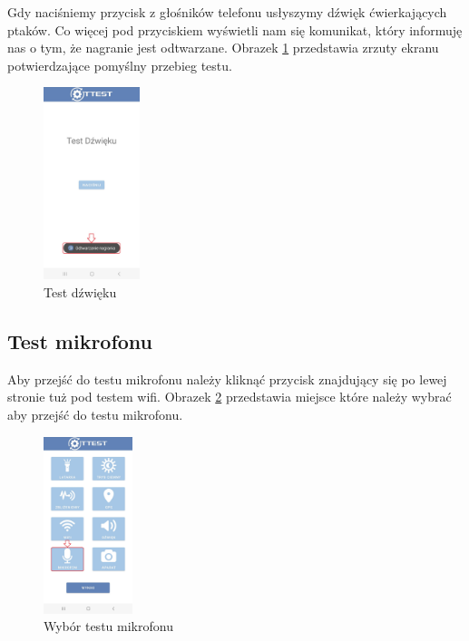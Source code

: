 \newpage


Gdy naciśniemy przycisk z głośników telefonu usłyszymy dźwięk ćwierkających ptaków. Co więcej pod przyciskiem wyświetli nam się komunikat, który informuję nas o tym, że nagranie jest odtwarzane.  
\newline
Obrazek \ref{rys:dźwięk2} przedstawia zrzuty ekranu potwierdzające pomyślny przebieg testu.

\begin{figure}[!hbt]
	\begin{center}
		\includegraphics[angle=360, width=0.25\textwidth]{rys/punkt6/dźwięk2}
		\caption{Test dźwięku}
		\label{rys:dźwięk2}
	\end{center}
\end{figure}

\newpage


\subsection{Test mikrofonu}

Aby przejść do testu mikrofonu należy kliknąć przycisk znajdujący się po lewej stronie tuż pod testem wifi.
\newline
Obrazek \ref{rys:menu6} przedstawia miejsce które należy wybrać aby przejść do testu mikrofonu.

\begin{figure}[!hbt]
	\begin{center}
		\includegraphics[angle=360, width=0.23\textwidth]{rys/punkt6/menu6}
		\caption{Wybór testu mikrofonu}
		\label{rys:menu6}
	\end{center}
\end{figure}

